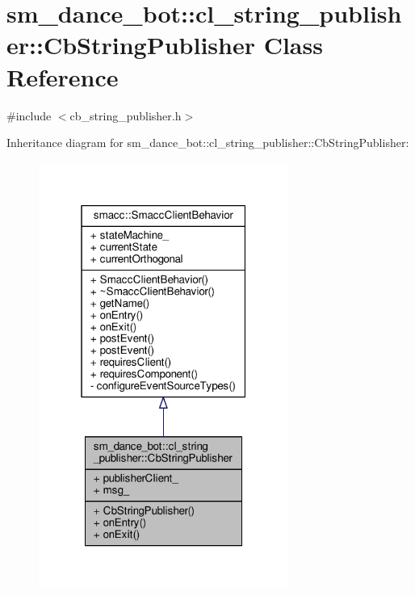\hypertarget{classsm__dance__bot_1_1cl__string__publisher_1_1CbStringPublisher}{}\section{sm\+\_\+dance\+\_\+bot\+:\+:cl\+\_\+string\+\_\+publisher\+:\+:Cb\+String\+Publisher Class Reference}
\label{classsm__dance__bot_1_1cl__string__publisher_1_1CbStringPublisher}


{\ttfamily \#include $<$cb\+\_\+string\+\_\+publisher.\+h$>$}



Inheritance diagram for sm\+\_\+dance\+\_\+bot\+:\+:cl\+\_\+string\+\_\+publisher\+:\+:Cb\+String\+Publisher\+:\nopagebreak
\begin{figure}[H]
\begin{center}
\leavevmode
\includegraphics[width=232pt]{classsm__dance__bot_1_1cl__string__publisher_1_1CbStringPublisher__inherit__graph}
\end{center}
\end{figure}


